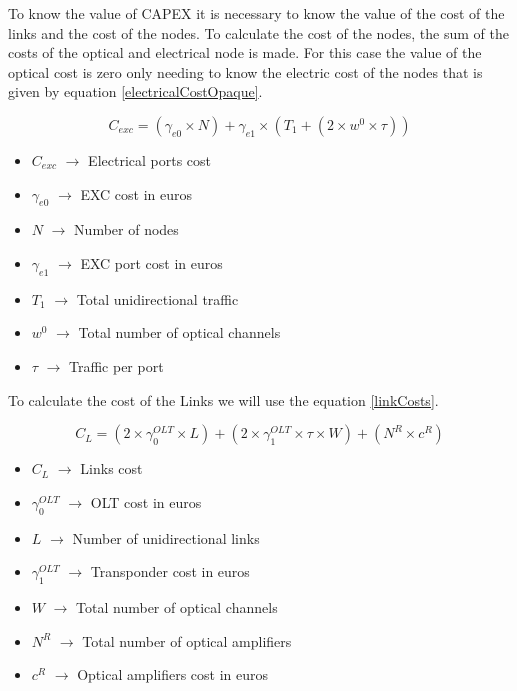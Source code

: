 To know the value of CAPEX it is necessary to know the value of the cost of the links and the cost of the nodes.
To calculate the cost of the nodes, the sum of the costs of the optical and electrical node is made. For this case the value of the optical cost is zero only needing to know the electric cost of the nodes that is given by equation \ref{electricalCostOpaque}.

\begin{equation}
C_{exc} = \left(\gamma_{e0}\times N\right) + \gamma_{e1} \times \left(T_1 + \left(2 \times w^0 \times \tau \right)\right)
\label{electricalCostOpaque}
\end{equation}

\begin{itemize}
\item{$C_{exc}$		$\rightarrow$	Electrical ports cost}
\item{$\gamma_{e0}$	$\rightarrow$	EXC cost in euros}
\item{$N$			$\rightarrow$	Number of nodes}
\item{$\gamma_{e1}$	$\rightarrow$	EXC port cost in euros}
\item{$T_1$         $\rightarrow$   Total unidirectional traffic}
\item{$w^0$			$\rightarrow$	Total number of optical channels}
\item{$\tau$		$\rightarrow$	Traffic per port}
\end{itemize}

\vspace{11pt}

To calculate the cost of the Links we will use the equation \ref{linkCosts}.

\begin{equation}
C_L = \left(2 \times \gamma_0^{OLT} \times L\right) + \left(2 \times \gamma_1^{OLT} \times \tau \times W\right) + \left(N^R \times c^R\right)
\label{linkCosts}
\end{equation}	
	
\begin{itemize}
\item{$C_L$				$\rightarrow$	Links cost}
\item{$\gamma_0^{OLT}$	$\rightarrow$	OLT cost in euros}
\item{$L$				$\rightarrow$	Number of unidirectional links}
\item{$\gamma_1^{OLT}$	$\rightarrow$	Transponder cost in euros}
\item{$W$             $\rightarrow$	    Total number of optical channels}
\item{$N^R$				$\rightarrow$	Total number of optical amplifiers}
\item{$c^R$				$\rightarrow$	Optical amplifiers cost in euros}
\end{itemize}

